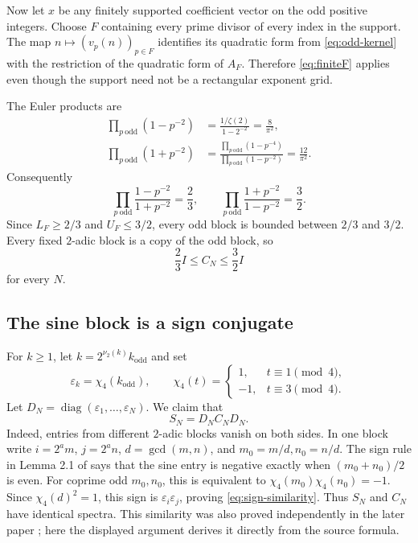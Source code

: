 \documentclass[11pt]{article}
\newcommand{\vtwo}{\nu_2}
\begin{document}
Now let \(x\) be any finitely supported coefficient vector on the odd positive
integers.  Choose \(F\) containing every prime divisor of every index in the
support.  The map \(n\mapsto(v_p(n))_{p\in F}\) identifies its quadratic form
from \eqref{eq:odd-kernel} with the restriction of the quadratic form of
\(A_F\).  Therefore \eqref{eq:finiteF} applies even though the support need
not be a rectangular exponent grid.

The Euler products are
\begin{align*}
 \prod_{p\ \mathrm{odd}}(1-p^{-2})
 &=\frac{1/\zeta(2)}{1-2^{-2}}=\frac8{\pi^2},\\
 \prod_{p\ \mathrm{odd}}(1+p^{-2})
 &=\frac{\prod_{p\ \mathrm{odd}}(1-p^{-4})}
         {\prod_{p\ \mathrm{odd}}(1-p^{-2})}
 =\frac{12}{\pi^2}.
\end{align*}
Consequently
\begin{equation}\label{eq:global-products}
 \prod_{p\ \mathrm{odd}}\frac{1-p^{-2}}{1+p^{-2}}=\frac23,
 \qquad
 \prod_{p\ \mathrm{odd}}\frac{1+p^{-2}}{1-p^{-2}}=\frac32.
\end{equation}
Since \(L_F\geq2/3\) and \(U_F\leq3/2\), every odd block is bounded between
\(2/3\) and \(3/2\).  Every fixed \(2\)-adic block is a copy of the odd block,
so
\begin{equation}\label{eq:cosine-bound}
 \frac23 I\leq C_N\leq\frac32 I
\end{equation}
for every \(N\).

\subsection{The sine block is a sign conjugate}

For \(k\geq1\), let \(k=2^{\vtwo(k)}k_{\mathrm{odd}}\) and set
\[
 \varepsilon_k=\chi_4(k_{\mathrm{odd}}),\qquad
 \chi_4(t)=\begin{cases}1,&t\equiv1\pmod4,\\-1,&t\equiv3\pmod4.
 \end{cases}
\]
Let \(D_N=\operatorname{diag}(\varepsilon_1,\ldots,\varepsilon_N)\).
We claim that
\begin{equation}\label{eq:sign-similarity}
 S_N=D_NC_ND_N.
\end{equation}
Indeed, entries from different \(2\)-adic blocks vanish on both sides.  In one
block write \(i=2^am\), \(j=2^an\), \(d=\gcd(m,n)\), and
\(m_0=m/d,n_0=n/d\).  The sign rule in Lemma 2.1 of \cite{SV} says that the
sine entry is negative exactly when \((m_0+n_0)/2\) is even.  For coprime odd
\(m_0,n_0\), this is equivalent to
\(\chi_4(m_0)\chi_4(n_0)=-1\).  Since \(\chi_4(d)^2=1\), this sign is
\(\varepsilon_i\varepsilon_j\), proving \eqref{eq:sign-similarity}.
Thus \(S_N\) and \(C_N\) have identical spectra.  This similarity was also
proved independently in the later paper \cite{KLSV}; here the displayed
argument derives it directly from the source formula.
\end{document}
